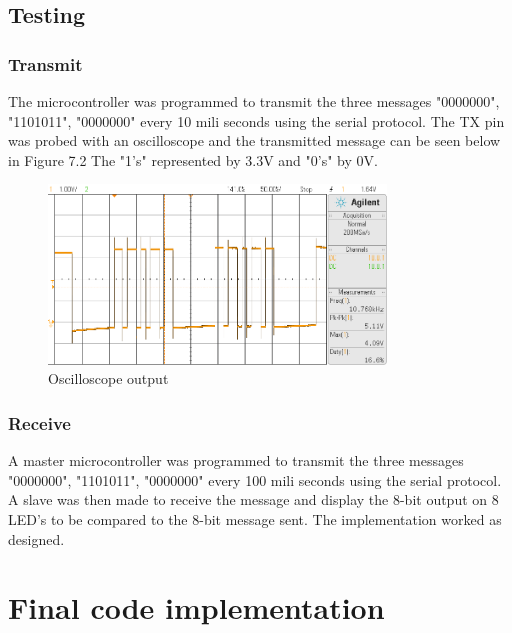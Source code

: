 \vspace{-8mm}
\subsection{Testing}
\vspace{-7mm}
\subsubsection{Transmit}
\vspace{-7mm}
The microcontroller was programmed to transmit the three messages "0000000", "1101011", "0000000" every 10 mili seconds using the serial protocol. The TX pin was probed with an oscilloscope and the transmitted message can be seen below in Figure 7.2 The "1's" represented by 3.3V and "0's" by 0V.

\begin{figure}[H]
\centering
\includegraphics[width=0.8\textwidth]{rs485.png}
\vspace{-6mm}
\caption{Oscilloscope output}
\vspace{-10mm}
\end{figure}
\subsubsection{Receive}
\vspace{-9mm}
A master microcontroller was programmed to transmit the three messages "0000000", "1101011", "0000000" every 100 mili seconds using the serial protocol. A slave was then made to receive the message and display the 8-bit output on 8 LED's to be compared to the 8-bit message sent. The implementation worked as designed.

\newpage
\section{Final code implementation}

